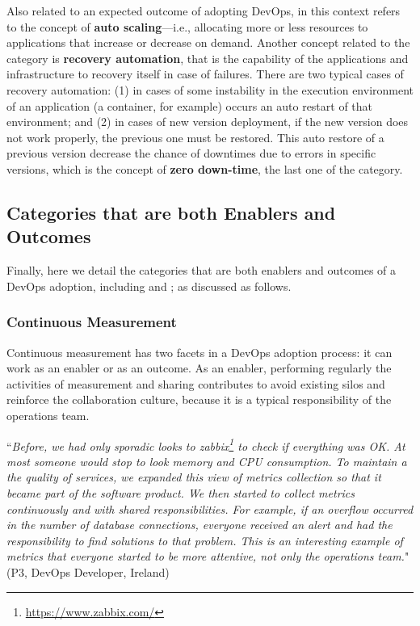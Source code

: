 Also related to an expected outcome of adopting DevOps,  in this 
context refers to the concept of \textbf{auto scaling}---i.e., 
allocating more or less resources to applications that increase or 
decrease on demand. Another concept related to 
the  category is \textbf{recovery automation}, that is
the capability of the applications and infrastructure to recovery itself in case of
failures. There are two typical cases of recovery automation: (1) in cases
of some instability in the execution environment of an application (a
container, for example) occurs an auto restart of that environment; and (2) in
cases of new version deployment, if the new version does not work properly, the
previous one must be restored. This auto restore of a previous version
decrease the chance of downtimes due to errors in specific versions, which
is the concept of \textbf{zero down-time}, the last one of the  category.

\subsection{Categories that are both Enablers and Outcomes}

Finally, here we detail the categories that are both enablers
and outcomes of a DevOps adoption, including 
and ; as discussed as follows.

\subsubsection{Continuous Measurement}

Continuous measurement has two facets in a DevOps adoption process: it can work
as an enabler or as an outcome. As an enabler, performing regularly the
activities of measurement and sharing 
 contributes to avoid existing silos and reinforce the
collaboration culture, because it is a typical responsibility of the operations
team.

\begin{mq}
``\emph{Before, we had only sporadic looks to
zabbix\footnote{\url{https://www.zabbix.com/}} to check if everything was OK.
At most someone would stop to look memory and CPU consumption. To maintain a
the quality of services, we expanded this view of metrics collection so that it
became part of the software product. We then started to collect metrics continuously
and with shared responsibilities. For example, if an overflow occurred in the
number of database connections, everyone received an alert and had
the responsibility to find solutions to that problem. This is an interesting example of
metrics that everyone started to be more attentive, not only the operations
team.}" (P3, DevOps Developer, Ireland)
\end{mq}

